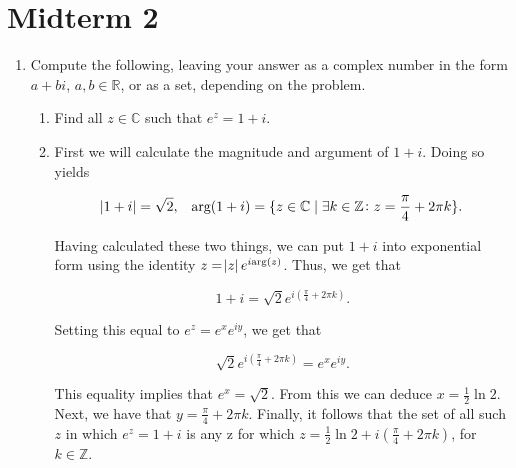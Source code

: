 \documentclass{article}
\makeatletter
\theoremstyle{definition}
\theoremstyle{remark}
\newenvironment{solution}[1][\bf{\textit{Solution}}]{\par
  
  \normalfont \topsep6\p@\@plus6\p@\relax
  \list{}{\leftmargin=0mm
          \rightmargin=0mm
          \settowidth{\itemindent}{\itshape#1}%
          \labelwidth=\itemindent
          \parsep=0pt \listparindent=\parindent 
  }
  \item[\hskip\labelsep
        \itshape
    #1\@addpunct{.}]\ignorespaces
}{%
  \popQED\endlist\@endpefalse
}
\makeatother
\begin{document}
\section{Midterm 2}

    \begin{enumerate}[leftmargin=*]
        \item Compute the following, leaving your answer as a complex number in the form $a+bi$, $a,b\in\mathbb{R}$, or as a set, depending on the problem.
        
        \begin{enumerate}[label=(\alph*)]
            \item Find all $z\in\mathbb{C}$ such that $e^z=1+i$.
                \begin{solution}
                    First we will calculate the magnitude and argument of $1+i$. Doing so yields
                    
                    \begin{align*}
                        \abs{1+i}&=\sqrt{2}, & \text{arg}(1+i)=\{z\in\mathbb{C}\mid\exists k\in\mathbb{Z}\colon z=\frac{\pi}{4}+2\pi k\}.
                    \end{align*}
                    
                    \noindent Having calculated these two things, we can put $1+i$ into exponential form using the identity $z=\abs{z}e^{i\text{arg}(z)}$. Thus, we get that
                    
                    \begin{equation*}
                        1+i=\sqrt{2}e^{i(\frac{\pi}{4}+2\pi k)}.
                    \end{equation*}
                    
                    \noindent Setting this equal to $e^z=e^xe^{iy}$, we get that
                    
                    \begin{equation*}
                        \sqrt{2}e^{i(\frac{\pi}{4}+2\pi k)}=e^xe^{iy}.
                    \end{equation*}
                    
                    \noindent This equality implies that $e^x=\sqrt{2}$. From this we can deduce $x=\frac{1}{2}\ln{2}$. Next, we have that $y=\frac{\pi}{4}+2\pi k$. Finally, it follows that the set of all such $z$ in which $e^z=1+i$ is any z for which $z=\frac{1}{2}\ln{2}+i(\frac{\pi}{4}+2\pi k)$, for $k\in\mathbb{Z}$.
                \end{solution}
                

\end{enumerate}
\end{enumerate}
\end{document}
